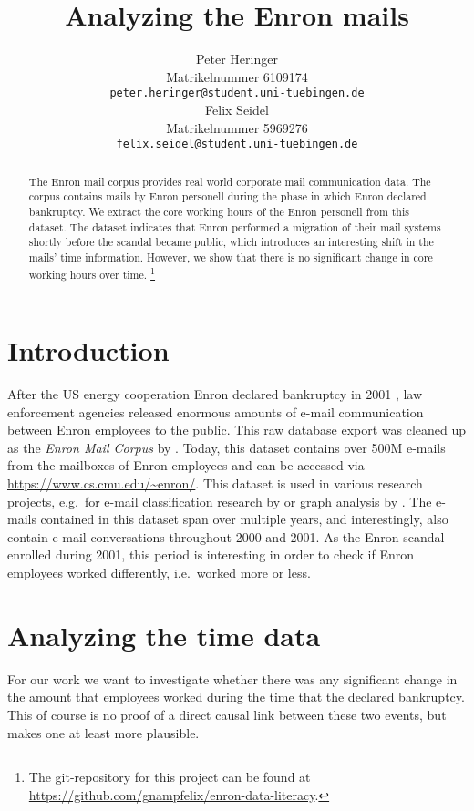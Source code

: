 \documentclass{article}
\title{Analyzing the Enron mails}
\author{%
  Peter Heringer\\
  Matrikelnummer 6109174 \\
  \texttt{peter.heringer@student.uni-tuebingen.de} \\
  \And Felix Seidel\\
  Matrikelnummer 5969276 \\
  \texttt{felix.seidel@student.uni-tuebingen.de} \\
}
\begin{document}
\maketitle

\begin{abstract}
  The Enron mail corpus provides real world corporate mail communication data.
  The corpus contains mails by Enron personell during the phase in which Enron
  declared bankruptcy. We extract the core working hours of the Enron personell
  from this dataset. The dataset indicates that Enron performed a migration of
  their mail systems shortly before the scandal became public, which introduces
  an interesting shift in the mails' time information. However, we show that
  there is no significant change in core working hours over time. \footnote{The
  git-repository for this project can be found at
  \url{https://github.com/gnampfelix/enron-data-literacy}.} 
\end{abstract}

\section{Introduction}
After the US energy cooperation Enron declared bankruptcy in 2001
\citep{10.1257/089533003765888403}, law enforcement agencies released enormous
amounts of e-mail communication between Enron employees to the public. This raw
database export was cleaned up as the \emph{Enron Mail Corpus} by
\citet{Klimt2004IntroducingTE}. Today, this dataset contains over 500M e-mails
from the mailboxes of Enron employees and can be accessed via
\url{https://www.cs.cmu.edu/~enron/}. This dataset is used in various research
projects, e.g.~for e-mail classification research by
\citet{10.1007/978-3-540-30115-8_22} or graph analysis by
\citet{Chapanond_2005}. The e-mails contained in this dataset span over multiple
years, and interestingly, also contain e-mail conversations throughout 2000 and
2001. As the Enron scandal enrolled during 2001, this period is interesting in
order to check if Enron employees worked differently, i.e.~worked more or less.

\section{Analyzing the time data}
For our work we want to investigate whether there was any significant change in
the amount that employees worked during the time that the declared bankruptcy.
This of course is no proof of a direct causal link between these two events, but
makes one at least more plausible.
\end{document}
